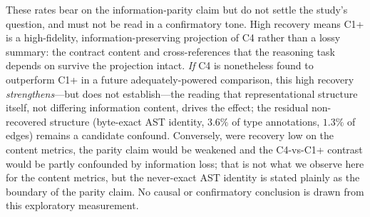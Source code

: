 These rates bear on the information-parity claim but do not settle the study's
question, and must not be read in a confirmatory tone. High recovery means C1+
is a high-fidelity, information-preserving projection of C4 rather than a lossy
summary: the contract content and cross-references that the reasoning task
depends on survive the projection intact. \emph{If} C4 is nonetheless found to
outperform C1+ in a future adequately-powered comparison, this high recovery
\emph{strengthens}---but does not establish---the reading that representational
structure itself, not differing information content, drives the effect; the
residual non-recovered structure (byte-exact AST identity, $3.6\%$ of type
annotations, $1.3\%$ of edges) remains a candidate confound. Conversely, were
recovery low on the content metrics, the parity claim would be weakened and the
C4-vs-C1+ contrast would be partly confounded by information loss; that is not
what we observe here for the content metrics, but the never-exact AST identity
is stated plainly as the boundary of the parity claim. No causal or confirmatory
conclusion is drawn from this exploratory measurement.
